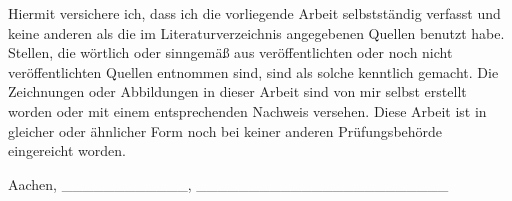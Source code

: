 Hiermit versichere ich, dass ich die vorliegende Arbeit selbstständig
verfasst und keine anderen als die im Literaturverzeichnis angegebenen
Quellen benutzt habe. Stellen, die wörtlich oder sinngemäß aus
veröffentlichten oder noch nicht veröffentlichten Quellen entnommen
sind, sind als solche kenntlich gemacht. Die Zeichnungen oder
Abbildungen in dieser Arbeit sind von mir selbst erstellt worden oder
mit einem entsprechenden Nachweis versehen. Diese Arbeit ist in gleicher
oder ähnlicher Form noch bei keiner anderen Prüfungsbehörde eingereicht
worden.

Aachen, \datum  \_\_\_\_\_\_\_\_\_\_\_\_,
\_\_\_\_\_\_\_\_\_\_\_\_\_\_\_\_\_\_\_\_\_\_\_\_
